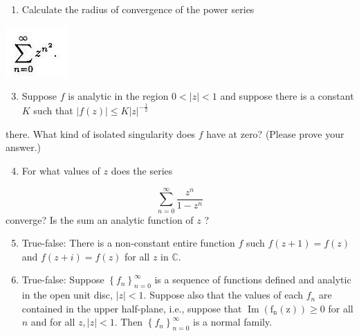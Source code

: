 \documentclass[10pt]{article}
\begin{document}
\begin{enumerate}
  \item Calculate the radius of convergence of the power series
\end{enumerate}
\includegraphics[max width=\textwidth]{2022_05_24_2551411173e3791eb07fg-23}

\begin{enumerate}
  \setcounter{enumi}{2}
  \item Suppose $f$ is analytic in the region $0<|z|<1$ and suppose there is a constant $K$ such that $|f(z)| \leq K|z|^{-\frac{1}{2}}$
\end{enumerate}
there. What kind of isolated singularity does $f$ have at zero? (Please prove your answer.)

\begin{enumerate}
  \setcounter{enumi}{3}
  \item For what values of $z$ does the series
\end{enumerate}
$$
\sum_{n=0}^{\infty} \frac{z^{n}}{1-z^{n}}
$$
converge? Is the sum an analytic function of $z$ ?

\begin{enumerate}
  \setcounter{enumi}{4}
  \item True-false: There is a non-constant entire function $f$ such $f(z+1)=f(z)$ and $f(z+i)=f(z)$ for all $z$ in $\mathbb{C}$.

  \item True-false: Suppose $\left\{f_{n}\right\}_{n=0}^{\infty}$ is a sequence of functions defined and analytic in the open unit disc, $|z|<1$. Suppose also that the values of each $f_{n}$ are contained in the upper half-plane, i.e., suppose that $\operatorname{Im}\left(\mathrm{f}_{\mathrm{n}}(\mathrm{z})\right) \geq 0$ for all $n$ and for all $z,|z|<1$. Then $\left\{f_{n}\right\}_{n=0}^{\infty}$ is a normal family.

\end{enumerate}
\end{document}

